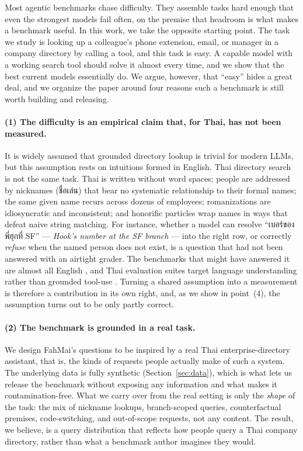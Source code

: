 \documentclass[11pt]{article}
\begin{document}
Most agentic benchmarks chase difficulty. They assemble tasks hard enough that even the strongest
models fail often, on the premise that headroom is what makes a benchmark useful. In this work, we
take the opposite starting point. The task we study is looking up a colleague's phone extension,
email, or manager in a company directory by calling a tool, and this task is easy. A capable model
with a working search tool should solve it almost every time, and we show that the best current models
essentially do. We argue, however, that ``easy'' hides a great deal, and we organize the paper around
four reasons such a benchmark is still worth building and releasing.

\paragraph{(1) The difficulty is an empirical claim that, for Thai, has not been measured.} It is
widely assumed that grounded directory lookup is trivial for modern LLMs, but this assumption rests on
intuitions formed in English. Thai directory search is not the same task. Thai is written without word
spaces; people are addressed by nicknames (ชื่อเล่น) that bear no systematic relationship to their
formal names; the same given name recurs across dozens of employees; romanizations are idiosyncratic
and inconsistent; and honorific particles wrap names in ways that defeat naive string matching. For
instance, whether a model can resolve ``เบอร์ของพี่ฮุกที่ SF'' --- \emph{Hook's number at the SF
branch} --- into the right row, or correctly \emph{refuse} when the named person does not exist, is a
question that had not been answered with an airtight grader. The benchmarks that might have answered it
are almost all English \citep{patil2023gorilla,qin2023toolllm,yao2024taubench}, and Thai evaluation
suites target language understanding rather than grounded tool-use
\citep{pipatanakul2023typhoon,susanto2025seahelm}. Turning a shared assumption into a measurement is
therefore a contribution in its own right, and, as we show in point~(4), the assumption turns out to
be only partly correct.

\paragraph{(2) The benchmark is grounded in a real task.} We design FahMai's questions to be inspired
by a real Thai enterprise-directory assistant, that is, the kinds of requests people actually make of
such a system. The underlying data is fully synthetic (Section~\ref{sec:data}), which is what lets us
release the benchmark without exposing any information and what makes it contamination-free. What we
carry over from the real setting is only the \emph{shape} of the task: the mix of nickname lookups,
branch-scoped queries, counterfactual premises, code-switching, and out-of-scope requests, not any
content. The result, we believe, is a query distribution that reflects how people query a Thai company
directory, rather than what a benchmark author imagines they would.
\end{document}
